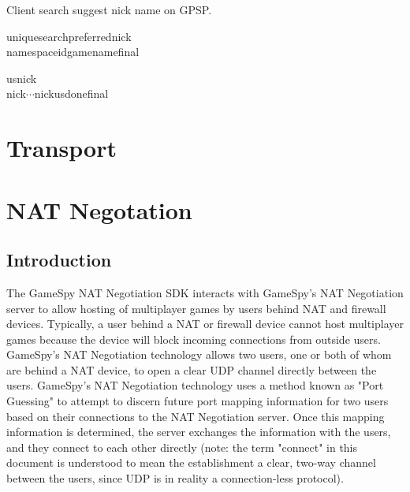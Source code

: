 \documentclass[oneside,titlepage,a4paper]{Definition/retrospy} %
\begin{document}
Client search suggest nick name on GPSP.

\ClientRequest
\begin{mybox}
	\tbs uniquesearch\tbs\tbs preferrednick\tbs<unique nick name>\\
	\tbs namespaceid\tbs<namespace id>\tbs gamename\tbs<game name>\tbs final\tbs
\end{mybox}
\ServerResponse
\begin{mybox}
	\tbs us\tbs<number of suggest nick>\tbs nick\tbs <nick name1>\\
	\tbs nick\tbs<nick name2>\tbs $\cdots$\tbs nick\tbs <nick name n>\tbs usdone\tbs final\tbs
\end{mybox}








\part{Transport}






\part{NAT Negotation}

\chapter{Introduction}
The GameSpy NAT Negotiation SDK interacts with GameSpy's NAT Negotiation server to allow hosting of multiplayer games by users behind NAT and firewall devices. Typically, a user behind a NAT or firewall device cannot host multiplayer games because the device will block incoming connections from outside users. GameSpy's NAT Negotiation technology allows two users, one or both of whom are behind a NAT device, to open a clear UDP channel directly between the users.
GameSpy's NAT Negotiation technology uses a method known as "Port Guessing" to attempt to discern future port mapping information for two users based on their connections to the NAT Negotiation server. Once this mapping information is determined, the server exchanges the information with the users, and they connect to each other directly (note: the term "connect" in this document is understood to mean the establishment a clear, two-way channel between the users, since UDP is in reality a connection-less protocol).
\end{document}
